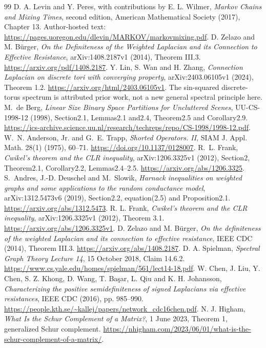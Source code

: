 \documentclass[11pt]{article}
\begin{document}
\begin{thebibliography}{99}
 D. A. Levin and Y. Peres, with contributions by
E. L. Wilmer, \emph{Markov Chains and Mixing Times}, second edition,
American Mathematical Society (2017), Chapter 13.
Author-hosted text: \url{https://pages.uoregon.edu/dlevin/MARKOV/markovmixing.pdf}.
 D. Zelazo and M. B{\"u}rger,
\emph{On the Definiteness of the Weighted Laplacian and its Connection to
Effective Resistance}, arXiv:1408.2187v1 (2014), Theorem III.3.
\url{https://arxiv.org/pdf/1408.2187}.
 Y. Lin, S. Wan and H. Zhang,
\emph{Connection Laplacian on discrete tori with converging property},
arXiv:2403.06105v1 (2024), Theorem 1.2.
\url{https://arxiv.org/html/2403.06105v1}.
The sin-squared discrete-torus spectrum is attributed prior work, not a new
general spectral principle here.
 M.~de Berg, \emph{Linear Size Binary Space Partitions for
Uncluttered Scenes}, UU-CS-1998-12 (1998), Section2.1, Lemmas2.1 and2.4,
Theorem2.5 and Corollary2.9.
\url{https://ics-archive.science.uu.nl/research/techreps/repo/CS-1998/1998-12.pdf}.
 W.~N. Anderson, Jr. and G.~E. Trapp,
\emph{Shorted Operators. II}, SIAM J. Appl. Math. 28(1) (1975), 60--71.
\url{https://doi.org/10.1137/0128007}.
 R.~L. Frank, \emph{Cwikel's theorem and the CLR inequality},
arXiv:1206.3325v1 (2012), Section2, Theorem2.1, Corollary2.2, Lemmas2.4--2.5.
\url{https://arxiv.org/abs/1206.3325}.
 S.~Andres, J.-D. Deuschel and M.~Slowik,
\emph{Harnack inequalities on weighted graphs and some applications to the random
conductance model}, arXiv:1312.5473v6 (2019), Section2.2, equation(2.5) and Proposition2.1.
\url{https://arxiv.org/abs/1312.5473}.
 R. L. Frank, \emph{Cwikel's theorem and the CLR inequality},
arXiv:1206.3325v1 (2012), Theorem 3.1.
\url{https://arxiv.org/abs/1206.3325v1}.
 D. Zelazo and M. B\"urger, \emph{On the definiteness of the
weighted Laplacian and its connection to effective resistance},
IEEE CDC (2014), Theorem III.3.
\url{https://arxiv.org/abs/1408.2187}.
 D. A. Spielman, \emph{Spectral Graph Theory Lecture 14},
15 October 2018, Claim 14.6.2.
\url{https://www.cs.yale.edu/homes/spielman/561/lect14-18.pdf}.
 W. Chen, J. Liu, Y. Chen, S. Z. Khong, D. Wang,
T. Ba\c{s}ar, L. Qiu and K. H. Johansson, \emph{Characterizing the positive
semidefiniteness of signed Laplacians via effective resistances},
IEEE CDC (2016), pp. 985--990.
\url{https://people.kth.se/~kallej/papers/network_cdc16chen.pdf}.
 N. J. Higham, \emph{What Is the Schur Complement of a Matrix?}, 1 June 2023, Theorem 1, generalized Schur complement. \url{https://nhigham.com/2023/06/01/what-is-the-schur-complement-of-a-matrix/}.

\end{thebibliography}
\end{document}
